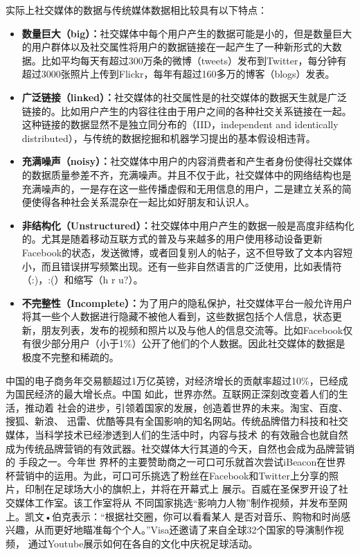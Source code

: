 实际上社交媒体的数据与传统媒体数据相比较具有以下特点：
\begin{itemize}
\item \textbf{数量巨大（big）：}社交媒体中每个用户产生的数据可能是小的，但是数量巨大的用户群体以及社交属性将用户的数据链接在一起产生了一种新形式的大数据。比如平均每天有超过300万条的微博（tweets）发布到Twitter，每分钟有超过3000张照片上传到Flickr，每年有超过160多万的博客（blogs）发表。
\item \textbf{广泛链接（linked）：}社交媒体的社交属性是的社交媒体的数据天生就是广泛链接的。比如用户产生的内容往往由于用户之间的各种社交关系链接在一起。这种链接的数据显然不是独立同分布的（IID，independent and identically distributed），与传统的数据挖掘和机器学习提出的基本假设相违背。
\item \textbf{充满噪声（noisy）：}社交媒体中用户的内容消费者和产生者身份使得社交媒体的数据质量参差不齐，充满噪声。并且不仅于此，社交媒体中的网络结构也是充满噪声的，一是存在这一些传播虚假和无用信息的用户，二是建立关系的简便使得各种社会关系混杂在一起比如好朋友和认识人。
\item \textbf{非结构化（Unstructured）：}社交媒体中用户产生的数据一般是高度非结构化的。尤其是随着移动互联方式的普及与来越多的用户使用移动设备更新Facebook的状态，发送微博，或者回复别人的帖子，这不但导致了文本内容短小，而且错误拼写频繁出现。还有一些非自然语言的广泛使用，比如表情符（:)，:(）和缩写（h r u?）。
\item \textbf{不完整性（Incomplete）：}为了用户的隐私保护，社交媒体平台一般允许用户将其一些个人数据进行隐藏不被他人看到，这些数据包括个人信息，状态更新，朋友列表，发布的视频和照片以及与他人的信息交流等。比如Facebook仅有很少部分用户（小于1\%）公开了他们的个人数据。因此社交媒体的数据是极度不完整和稀疏的。
\end{itemize}
中国的电子商务年交易额超过1万亿英镑，对经济增长的贡献率超过10\%，已经成为国民经济的最大增长点。中国 如此，世界亦然。互联网正深刻改变着人们的生活，推动着 社会的进步，引领着国家的发展，创造着世界的未来。淘宝、百度、搜狐、新浪、 迅雷、优酷等具有全国影响的知名网站。传统品牌借力科技和社交媒体，当科学技术已经渗透到人们的生活中时，内容与技术 的有效融合也就自然成为传统品牌营销的有效武器。社交媒体大行其道的今天，自然也会成为品牌营销的 手段之一。今年世 界杯的主要赞助商之一可口可乐就首次尝试iBeacon在世界杯营销中的运用。为此，可口可乐挑选了粉丝在Facebook和Twitter上分享的照片，印制在足球场大小的旗帜上，并将在开幕式上 展示。百威在圣保罗开设了社交媒体工作室。该工作室将从 不同国家挑选“影响力人物”制作视频，并发布至网上。凯文•伯克表示：“根据社交圈，你可以看看某人 是否对音乐、购物和时尚感兴趣，从而更好地瞄准每个个人。”Visa还邀请了来自全球32个国家的导演制作视频， 通过Youtube展示如何在各自的文化中庆祝足球活动。

